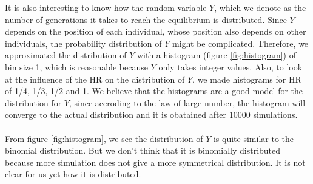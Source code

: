 It is also interesting to know how the random variable $Y$, which we denote as the number of generations it takes to reach the equilibrium is distributed. Since $Y$ depends on the position of each individual, whose position also depends on other individuals, the probability distribution of $Y$ might be complicated. Therefore, we approximated the distribution of $Y$ with a histogram (figure \ref{fig:histogram}) of bin size 1, which is reasonable because $Y$ only takes integer values. Also, to look at the influence of the HR on the distribution of $Y$, we made histograms for HR of 1/4, 1/3, 1/2 and 1.  We believe that the histograms are a good model for the distribution for $Y$, since accroding to the law of large number, the histogram will converge to the actual distribution and it is obatained after 10000 simulations.\\
\\
From figure \ref{fig:histogram}, we see the distribution of $Y$ is quite similar to the binomial distribution. But we don't think that it is binomially distributed because more simulation does not give a more symmetrical distribution. It is not clear for us yet how it is distributed. 
